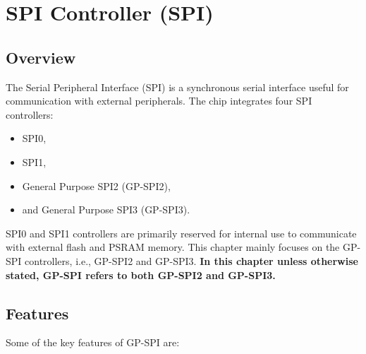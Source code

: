 \documentclass[main\_\_EN.tex]{subfiles}
\begin{document}

\ifglobal
\else
    {\let\clearpage\relax \listoftodos}
    \tableofcontents
    \listoftables
    \listoffigures
\fi



\hypertarget{spi}{}
\chapter{SPI Controller (SPI)}
\label{mod:spi}


\section{Overview}

The Serial Peripheral Interface (SPI) is a synchronous serial interface useful for communication with external peripherals. 
The \chipname{} chip integrates four SPI controllers:
\begin{itemize}
  \item SPI0,
  \item SPI1,
  \item General Purpose SPI2 (GP-SPI2),
  \item and General Purpose SPI3 (GP-SPI3).
\end{itemize}

SPI0 and SPI1 controllers are primarily reserved for internal use to communicate with external flash and PSRAM memory. This chapter mainly focuses on the GP-SPI controllers, i.e., GP-SPI2 and GP-SPI3. \textbf{In this chapter unless otherwise stated, GP-SPI refers to both GP-SPI2 and GP-SPI3.}



\section{Features}\label{sec:features}

Some of the key features of GP-SPI are:
\end{document}
